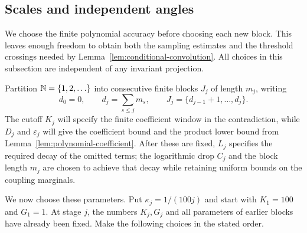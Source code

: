 \subsection{Scales and independent angles}\label{p:sec:scales}

We choose the finite polynomial accuracy before choosing each new block.
This leaves enough freedom to obtain both the sampling estimates and the
threshold crossings needed by Lemma~\ref{lem:conditional-convolution}.
All choices in this subsection are independent of any invariant projection.

Partition $\mathbb N=\{1,2,\ldots\}$ into consecutive finite blocks $J_j$ of
length $m_j$, writing
\[
 d_0=0,\qquad d_j=\sum_{s\le j}m_s,\qquad
 J_j=\{d_{j-1}+1,\ldots,d_j\}.
\]
The cutoff $K_j$ will specify the finite coefficient window in the
contradiction, while $D_j$ and $\varepsilon_j$ will give the coefficient
bound and the product lower bound from Lemma~\ref{lem:polynomial-coefficient}.  After these
are fixed, $L_j$ specifies the required decay of the omitted terms;
the logarithmic drop $C_j$ and the block length $m_j$ are chosen to
achieve that decay while retaining uniform bounds on the coupling
marginals.

We now choose these parameters.  Put $\kappa_j=1/(100j)$ and
start with $K_1=100$ and $G_1=1$.  At stage $j$, the numbers $K_j,G_j$
and all parameters of earlier blocks have already been fixed.  Make
the following choices in the stated order.

